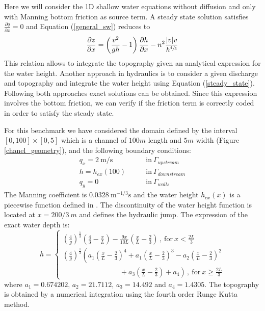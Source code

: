 \documentclass[a4paper,12pt]{article}
\newcommand{\pder}[2]{\frac{\partial#1}{\partial#2}}
\newcommand{\abs}[1]{\lvert#1\rvert}
\begin{document}
Here we will consider the 1D shallow water equations without diffusion and only with Manning bottom friction as source term. A steady state solution satisfies $\pder{q}{x}=0$ and Equation (\ref{general_sw}) reduces to
\begin{equation} \label{steady_state}
\pder{z}{x} = \left(\frac{v^2}{gh}-1\right) \pder{h}{x} - n^2\frac{\abs{v}v}{h^{\sfrac{4}{3}}}
\end{equation}
This relation allows to integrate the topography given an analytical expression for the water height. Another approach in hydraulics is to consider a given discharge and topography and integrate the water height using Equation (\ref{steady_state}). Following both approaches exact solutions can be obtained. Since this expression involves the bottom friction, we can verify if the friction term is correctly coded in order to satisfy the steady state.

For this benchmark we have considered the domain defined by the interval $[0,100]\times[0,5]$ which is a channel of $100m$ length and $5m$ width (Figure \ref{chanel_geometry}), and the following boundary conditions:
\begin{equation}
\begin{split}
    q_x = 2\ \text{m/s} \qquad &\text{in} \ \Gamma_{upstream} \\
    h = h_{ex}(100) \qquad &\text{in} \ \Gamma_{downstream} \\
    q_y = 0 \qquad &\text{in} \ \Gamma_{walls}
\end{split}
\end{equation}
The Manning coefficient is $0.0328\ \text{m}^{-1/3}\text{s}$ and the water height $h_{ex}(x)$ is a piecewise function defined in \cite{delestre2013}. The discontinuity of the water height function is located at $x=200/3\ m$ and defines the hydraulic jump. The expression of the exact water depth is:
\begin{equation} \label{jump_height_definition}
    h = \begin{cases}
        \left(\frac{4}{g}\right)^\frac{1}{3} \left(\frac{4}{3} - \frac{x}{L}\right) - \frac{9x}{10L}
            \left(\frac{x}{L} - \frac{2}{3}\right) \, ,\ \text{for} \ x < \frac{2L}{3}\\
        \left(\frac{4}{g}\right)^\frac{1}{3} \left(
              a_1 \left(\frac{x}{L} - \frac{2}{3}\right)^4
            + a_1 \left(\frac{x}{L} - \frac{2}{3}\right)^3
            - a_2 \left(\frac{x}{L} - \frac{2}{3}\right)^2 \right. \\ \left. \qquad\qquad\qquad\qquad
            + a_3 \left(\frac{x}{L} - \frac{2}{3}\right)
            + a_4
        \right) \, ,\ \text{for} \ x \geq \frac{2L}{3}
    \end{cases}
\end{equation}
where $a_1=0.674202$, $a_2=21.7112$, $a_3=14.492$ and $a_4=1.4305$. The topography is obtained by a numerical integration using the fourth order Runge Kutta method.
\end{document}
